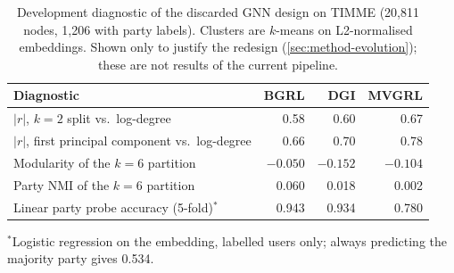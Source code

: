 \begin{table}[t]
\centering
\caption{Development diagnostic of the discarded GNN design on TIMME (20,811 nodes,
1,206 with party labels). Clusters are $k$-means on L2-normalised embeddings. Shown
only to justify the redesign (\cref{sec:method-evolution}); these are not results of
the current pipeline.}
\label{tab:gnn-diag}
\small
\begin{tabular}{@{}l r r r@{}}
\toprule
Diagnostic & BGRL & DGI & MVGRL \\
\midrule
$|r|$, $k=2$ split vs.\ log-degree           & 0.58   & 0.60   & 0.67   \\
$|r|$, first principal component vs.\ log-degree & 0.66 & 0.70  & 0.78   \\
Modularity of the $k=6$ partition            & $-0.050$ & $-0.152$ & $-0.104$ \\
Party NMI of the $k=6$ partition             & 0.060  & 0.018  & 0.002  \\
Linear party probe accuracy (5-fold)$^{*}$   & 0.943  & 0.934  & 0.780  \\
\bottomrule
\end{tabular}

\smallskip
\footnotesize
$^{*}$Logistic regression on the embedding, labelled users only; always predicting
the majority party gives 0.534.
\end{table}
